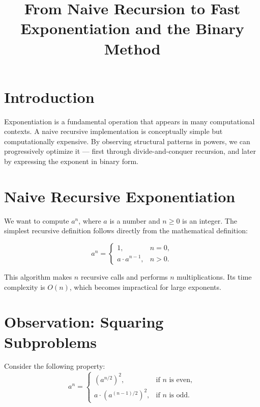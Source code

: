 \documentclass[a4paper,12pt]{article}
\title{From Naive Recursion to Fast Exponentiation and the Binary Method}
\author{}
\date{}
\begin{document}
    \maketitle

    \section{Introduction}

    Exponentiation is a fundamental operation that appears in many computational contexts.
    A naive recursive implementation is conceptually simple but computationally expensive.
    By observing structural patterns in powers, we can progressively optimize it --- first through divide-and-conquer recursion, and later by expressing the exponent in binary form.

    \section{Naive Recursive Exponentiation}

    We want to compute \( a^n \), where \( a \) is a number and \( n \ge 0 \) is an integer.
    The simplest recursive definition follows directly from the mathematical definition:

    \[
        a^n =
        \begin{cases}
            1, & n = 0, \\
            a \cdot a^{n-1}, & n > 0.
        \end{cases}
    \]

    

    This algorithm makes \( n \) recursive calls and performs \( n \) multiplications.
    Its time complexity is \( O(n) \), which becomes impractical for large exponents.

    \section{Observation: Squaring Subproblems}

    Consider the following property:
    \[
        a^n =
        \begin{cases}
        (a^{n/2})^2, & \text{if $n$ is even}, \\
        a \cdot (a^{(n-1)/2})^2, & \text{if $n$ is odd}.
        \end{cases}
    \]
\end{document}
